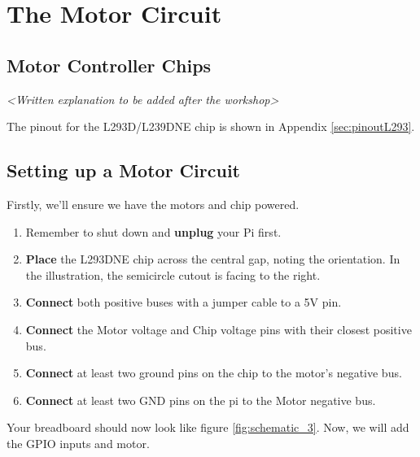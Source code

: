 \section{The Motor Circuit}
	
	\subsection{Motor Controller Chips}
		
		\textit{<Written explanation to be added after the workshop>}
		

		
		The pinout for the L293D/L239DNE chip is shown in Appendix \autoref{sec:pinoutL293}.

			
	\subsection{Setting up a Motor Circuit}
		
		Firstly, we'll ensure we have the motors and chip powered.
		
		\begin{enumerate}[noitemsep]
			\item Remember to shut down and \textbf{unplug} your Pi first.
			\item \textbf{Place} the L293DNE chip across the central gap, noting the orientation. In the illustration, the semicircle cutout is facing to the right.
			\item \textbf{Connect} both positive buses with a jumper cable to a 5V pin. 
			\item \textbf{Connect} the Motor voltage and Chip voltage pins with their closest positive bus.
			\item \textbf{Connect} at least two ground pins on the chip to the motor's negative bus.
			\item \textbf{Connect} at least two GND pins on the pi to the Motor negative bus.
		\end{enumerate}
		
		Your breadboard should now look like figure \ref{fig:schematic_3}. Now, we will add the GPIO inputs and motor.
		
